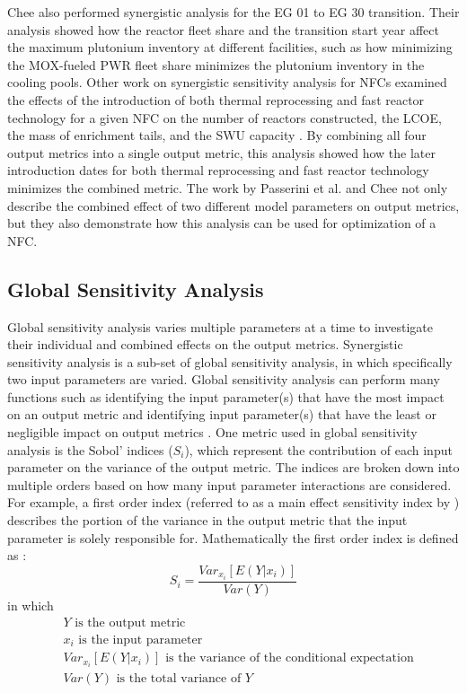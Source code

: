 Chee \cite{chee_sensitivity_2019} also performed synergistic analysis for 
the \gls{EG} 01 to \gls{EG} 30 transition. 
Their analysis showed how the reactor fleet share and the transition start 
year affect the maximum plutonium inventory at different facilities, such as 
how minimizing the \gls{MOX}-fueled \gls{PWR} fleet share minimizes the 
plutonium inventory in the cooling pools. 
Other work on synergistic sensitivity analysis for \glspl{NFC} examined the 
effects of the introduction of both thermal reprocessing and fast reactor 
technology for a given \gls{NFC} on the number of reactors constructed, 
the \gls{LCOE}, the mass of enrichment tails, and the \gls{SWU} 
capacity \cite{passerini_systematic_2014}. By combining all four output 
metrics into a single output metric, this analysis showed how the 
later introduction dates for both thermal reprocessing 
and fast reactor technology minimizes the combined metric. The work by 
Passerini 
et al. \cite{passerini_systematic_2014} and Chee \cite{chee_sensitivity_2019}
not only describe the combined effect of two different model parameters on 
output metrics, but they also demonstrate how this analysis can be used for 
optimization of a \gls{NFC}. 

\subsection{Global Sensitivity Analysis}\label{sec:global_background}
Global sensitivity analysis varies multiple parameters at a time to 
investigate their individual and combined effects on the output metrics. 
Synergistic sensitivity analysis is a sub-set of global sensitivity 
analysis, in which specifically two input parameters are varied.
Global sensitivity analysis can perform many functions such as identifying 
the input 
parameter(s) that have the most impact on an output metric and identifying 
input parameter(s) that have the least or negligible impact on output 
metrics \cite{thiolliere_methodology_2018}. One metric used 
in global sensitivity analysis is the Sobol' indices ($S_{i}$), which 
represent the 
contribution of each input parameter on the variance of the output metric.
The indices are broken down into multiple orders based on how many 
input parameter interactions are considered. For example, a first order 
index (referred to as a main effect sensitivity index by 
\cite{adams_dakota_2021}) describes the 
portion of the variance in the output metric that the input parameter is 
solely 
responsible for. Mathematically the first order index is defined as  
\cite{adams_dakota_2021}:
\begin{equation}
    S_i = \frac{Var_{x_i}[E(Y|x_i)]}{Var(Y)}
\end{equation}
in which 
\begin{align*}
    &Y \text{ is the output metric} \\
    &x_i \text { is the input parameter}\\
    &Var_{x_i}[E(Y|x_i)] \text{ is the variance of the conditional expectation}\\
    &Var(Y) \text{ is the total variance of } Y
\end{align*}

